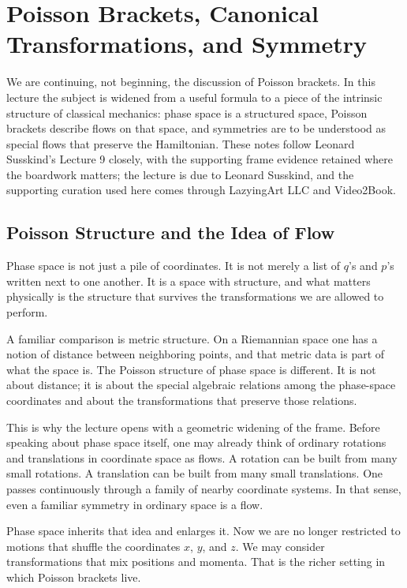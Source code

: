 \chapter{Poisson Brackets, Canonical Transformations, and Symmetry}

We are continuing, not beginning, the discussion of Poisson brackets. In this lecture the subject is widened from a useful formula to a piece of the intrinsic structure of classical mechanics: phase space is a structured space, Poisson brackets describe flows on that space, and symmetries are to be understood as special flows that preserve the Hamiltonian. These notes follow Leonard Susskind's Lecture 9 closely, with the supporting frame evidence retained where the boardwork matters; the lecture is due to Leonard Susskind, and the supporting curation used here comes through LazyingArt LLC and Video2Book.

\section{Poisson Structure and the Idea of Flow}

Phase space is not just a pile of coordinates. It is not merely a list of \(q\)'s and \(p\)'s written next to one another. It is a space with structure, and what matters physically is the structure that survives the transformations we are allowed to perform.

A familiar comparison is metric structure. On a Riemannian space one has a notion of distance between neighboring points, and that metric data is part of what the space is. The Poisson structure of phase space is different. It is not about distance; it is about the special algebraic relations among the phase-space coordinates and about the transformations that preserve those relations.

This is why the lecture opens with a geometric widening of the frame. Before speaking about phase space itself, one may already think of ordinary rotations and translations in coordinate space as flows. A rotation can be built from many small rotations. A translation can be built from many small translations. One passes continuously through a family of nearby coordinate systems. In that sense, even a familiar symmetry in ordinary space is a flow.

Phase space inherits that idea and enlarges it. Now we are no longer restricted to motions that shuffle the coordinates \(x\), \(y\), and \(z\). We may consider transformations that mix positions and momenta. That is the richer setting in which Poisson brackets live.

